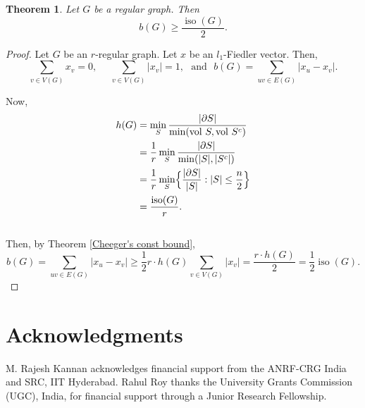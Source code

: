 \documentclass[12pt]{article}
\newtheorem{theorem}{Theorem}[section]
\DeclareMathOperator{\vol}{vol}
\DeclareMathOperator{\iso}{iso}
\begin{document}
\begin{theorem}
    Let $G$ be a regular graph. Then $$ b(G) \geq \frac {\iso(G)}{2}.$$
\end{theorem}

\begin{proof}
    
Let $G$ be an $r$-regular graph. Let $x$ be an $l_1$-Fiedler vector. Then,  
$$
\sum_{v \in V(G)} x_v=0, ~~~~~~\sum _{v \in V(G)} \vert x_v \vert =1, ~~~\mbox{and}~~~ b(G)=\sum_{uv \in E(G)} \vert x_u-x_v \vert.
$$

Now, 
\begin{align*}
  h(G) &=\min_S \frac{\vert \partial S \vert}{\min(\vol\,S, \vol\,S^c)} \\
  &=\frac{1}{r}\min_S \frac{\vert\partial S\vert }{\min(\vert S \vert, \vert S^c \vert)}\\
    &=\frac{1}{r}\min_S \Bigl\{\frac{\vert\partial S\vert}{\vert S\vert} : \vert S \vert \leq \frac{n}{2}  \Bigl\}\\
  &=\frac{\iso(G)}{r}.
\end{align*}\\
Then, by Theorem \ref{Cheeger's const bound},
$$
b(G)=\sum_{uv \in E(G)} \vert x_u-x_v \vert \geq \frac{1}{2}r\cdot h(G) \sum_{v \in V(G)} \vert x_v\vert  =\frac{r\cdot h(G)}{2}=\frac{1}{2}\iso(G).
$$
\end{proof}






 \section*{Acknowledgments}
  M. Rajesh Kannan acknowledges financial support from the ANRF-CRG India and  SRC, IIT Hyderabad. Rahul Roy thanks the University Grants Commission (UGC), India, for financial support through a Junior Research Fellowship.
	
	
\end{document}
